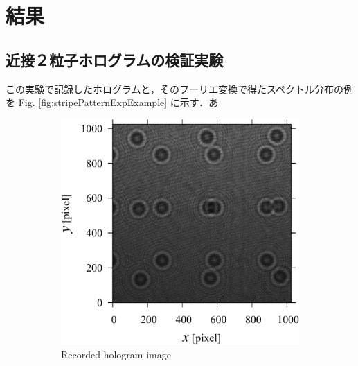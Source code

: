 \section{結果}
\subsection{近接２粒子ホログラムの検証実験}
この実験で記録したホログラムと，そのフーリエ変換で得たスペクトル分布の例を Fig. \ref{fig:stripePatternExpExample} に示す．あ

\begin{figure}[htbp!]
    \centering
    \begin{subfigure}[c]{0.45\linewidth}
        \includegraphics[width=\linewidth]{./Figure/4_Results/stripe_pattern_experiment/recorded_data/a.pdf}
        \caption{Recorded hologram image}
        \label{fig:stripePatternExpExample:a}
    \end{subfigure}
    \hfill
    \begin{subfigure}[c]{0.45\linewidth}

\end{subfigure}
\end{figure}
